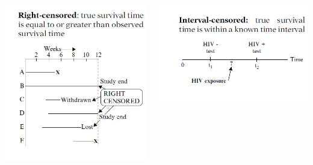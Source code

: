 \documentclass{beamer}
\theoremstyle{definition}
\begin{document}
\begin{frame}
\begin{columns}
    \begin{column}{0.48\textwidth}
        \includegraphics[width = \textwidth]{Ch1-RightCensor.JPG}
    \end{column}
    \hspace{-40pt}
    \begin{column}{0.48\textwidth}
         \includegraphics[width = \textwidth]{Ch1-IntervalCensor.JPG} \\

\end{column}
\end{columns}
\end{frame}
\end{document}
